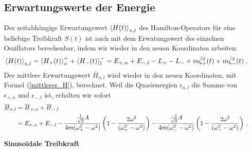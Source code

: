   \subsection{Erwartungswerte der Energie}
    Der zeitabhängige Erwartungswert $\braket{H(t)}_{n,l}$ des Hamilton-Operators für eine beliebige Treibkraft $S(t)$ ist auch mit dem Erwatungswert des einzelnen Oszillators berechenbar, indem wir wieder in den neuen Koordinaten arbeiten:
    \begin{align}
      \braket{H(t)}_{n,l} = \braket{H_+(t)}_n^+ + \braket{H_-(t)}_l^- %
      = E_{+,n}+E_{-,l} -L_+-L_- +m\dot\zeta_+^2(t)+m\dot\zeta_-^2(t) \; .
    \end{align}
    Der mittlere Erwartungswert $\overline{H}_{n,l}$ wird wieder in den neuen Koordinaten, mit Formel (\ref{mittleres_H}), berechnet.
    Weil die Quasienergien $\epsilon_{n,l}$ die Summe von $\epsilon_{+,n}$ und $\epsilon_{-,l}$ ist, erhalten wir sofort
    \begin{align}
      \overline{H}_{n,l}&=\overline{H}_{+,n}+\overline{H}_{-,l}  \notag\\
      &=E_{+,n}+E_{-,l} - \frac{\frac{1}{\sqrt 2} A}{4m(\omega_+^2-\omega^2)}\left(1-\frac{2\omega^2}{(\omega_+^2-\omega^2)}\right)
      - \frac{\frac{-1}{\sqrt 2} A}{4m(\omega_-^2-\omega^2)}\left(1-\frac{2\omega^2}{(\omega_-^2-\omega^2)}\right) \; .
    \end{align}

    \textbf{Sinusoidale Treibkraft}

